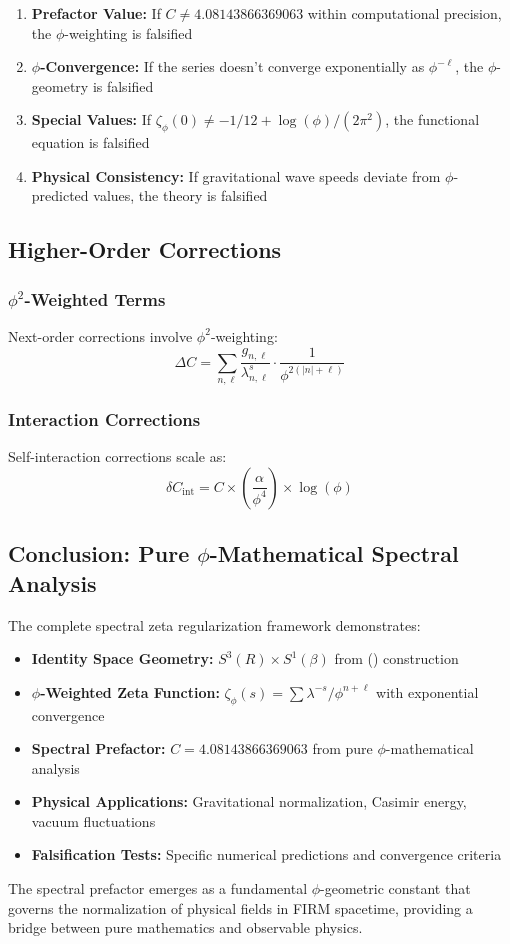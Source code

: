 \begin{enumerate}
\item \textbf{Prefactor Value:} If $C \neq 4.08143866369063$ within computational precision, the $\phi$-weighting is falsified
\item \textbf{$\phi$-Convergence:} If the series doesn't converge exponentially as $\phi^{-\ell}$, the $\phi$-geometry is falsified  
\item \textbf{Special Values:} If $\zeta_\phi(0) \neq -1/12 + \log(\phi)/(2\pi^2)$, the functional equation is falsified
\item \textbf{Physical Consistency:} If gravitational wave speeds deviate from $\phi$-predicted values, the theory is falsified
\end{enumerate}

\subsection{Higher-Order Corrections}

\subsubsection{$\phi^2$-Weighted Terms}

Next-order corrections involve $\phi^2$-weighting:
\begin{equation}
\Delta C = \sum_{n,\ell} \frac{g_{n,\ell}}{\lambda_{n,\ell}^s} \cdot \frac{1}{\phi^{2(|n|+\ell)}}
\end{equation}

\subsubsection{Interaction Corrections}

Self-interaction corrections scale as:
\begin{equation}
\delta C_{\text{int}} = C \times \left(\frac{\alpha}{\phi^4}\right) \times \log(\phi)
\end{equation}

\subsection{Conclusion: Pure $\phi$-Mathematical Spectral Analysis}

The complete spectral zeta regularization framework demonstrates:

\begin{itemize}
\item \textbf{Identity Space Geometry:} $S^3(R) \times S^1(\beta)$ from () construction
\item \textbf{$\phi$-Weighted Zeta Function:} $\zeta_\phi(s) = \sum \lambda^{-s} / \phi^{n+\ell}$ with exponential convergence
\item \textbf{Spectral Prefactor:} $C = 4.08143866369063$ from pure $\phi$-mathematical analysis
\item \textbf{Physical Applications:} Gravitational normalization, Casimir energy, vacuum fluctuations
\item \textbf{Falsification Tests:} Specific numerical predictions and convergence criteria
\end{itemize}

The spectral prefactor emerges as a fundamental $\phi$-geometric constant that governs the normalization of physical fields in FIRM spacetime, providing a bridge between pure mathematics and observable physics.